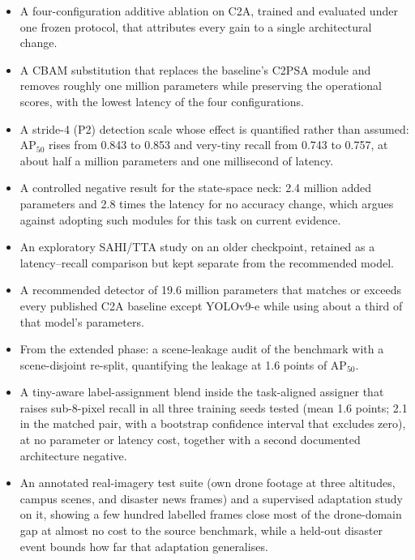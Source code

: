 \begin{itemize}
  \item A four-configuration additive ablation on C2A, trained and evaluated
        under one frozen protocol, that attributes every gain to a single
        architectural change.
  \item A CBAM substitution that replaces the baseline's C2PSA module and
        removes roughly one million parameters while preserving the
        operational scores, with the lowest latency of the four configurations.
  \item A stride-4 (P2) detection scale whose effect is quantified rather
        than assumed: $\mathrm{AP}_{50}$ rises from 0.843 to 0.853 and
        very-tiny recall from 0.743 to 0.757, at about half a million
        parameters and one millisecond of latency.
  \item A controlled negative result for the state-space neck: 2.4 million
        added parameters and 2.8 times the latency for no accuracy change,
        which argues against adopting such modules for this task on current
        evidence.
  \item An exploratory SAHI/TTA study on an older checkpoint, retained as a
        latency--recall comparison but kept separate from the recommended model.
  \item A recommended detector of 19.6 million parameters that matches or
        exceeds every published C2A baseline except YOLOv9-e while using
        about a third of that model's parameters.
  \item From the extended phase: a scene-leakage audit of the benchmark with
        a scene-disjoint re-split, quantifying the leakage at 1.6 points of
        $\mathrm{AP}_{50}$.
  \item A tiny-aware label-assignment blend inside the task-aligned assigner
        that raises sub-8-pixel recall in all three training seeds tested
        (mean 1.6 points; 2.1 in the matched pair, with a bootstrap
        confidence interval that excludes zero), at no parameter or latency
        cost, together with a second documented architecture negative.
  \item An annotated real-imagery test suite (own drone footage at three
        altitudes, campus scenes, and disaster news frames) and a supervised
        adaptation study on it, showing a few hundred labelled frames close
        most of the drone-domain gap at almost no cost to the source
        benchmark, while a held-out disaster event bounds how far that
        adaptation generalises.
\end{itemize}


